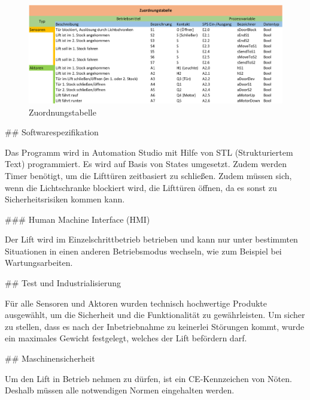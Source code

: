 \begin{markdown}
\begin{figure}[H]
    \centering
    \includegraphics[width=\textwidth]{./images/Zuordnungstabelle.png}
    \caption[Zuordnungstabelle]{Zuordnungstabelle}
\end{figure}

## Softwarespezifikation

Das Programm wird in Automation Studio mit Hilfe von STL (Strukturiertem Text) programmiert. Es wird auf Basis von States umgesetzt. Zudem werden Timer benötigt, um die Lifttüren zeitbasiert zu schließen. Zudem müssen sich, wenn die Lichtschranke blockiert wird, die Lifttüren öffnen, da es sonst zu Sicherheitsrisiken kommen kann. 

### Human Machine Interface (HMI)

Der Lift wird im Einzelschrittbetrieb betrieben und kann nur unter bestimmten Situationen in einen anderen Betriebsmodus wechseln, wie zum Beispiel bei Wartungsarbeiten.

## Test und Industrialisierung

Für alle Sensoren und Aktoren wurden technisch hochwertige Produkte ausgewählt, um die Sicherheit und die Funktionalität zu gewährleisten. Um sicher zu stellen, dass es nach der Inbetriebnahme zu keinerlei Störungen kommt, wurde ein maximales Gewicht festgelegt, welches der Lift befördern darf.

## Maschinensicherheit

Um den Lift in Betrieb nehmen zu dürfen, ist ein CE-Kennzeichen von Nöten. Deshalb müssen alle notwendigen Normen eingehalten werden.
\end{markdown}
